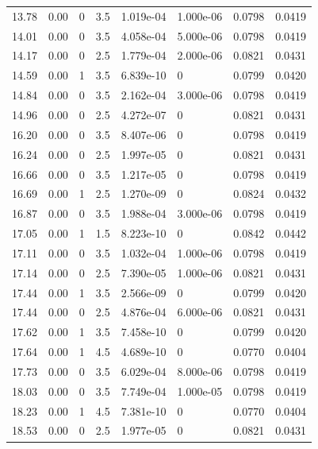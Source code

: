 \documentclass[preview]{standalone}
\begin{document}
{{{\begin{tabular}{L{1.2cm}C{1.2cm} C{0.3cm}C{0.5cm} C{1.4cm}C{1.4cm} C{1.4cm}C{1.4cm}}
  13.78  &  0.00  & 0     & 3.5 &  1.019e-04  & 1.000e-06  & 0.0798 &  0.0419   \\ 
  14.01  &  0.00  & 0     & 3.5 &  4.058e-04  & 5.000e-06  & 0.0798 &  0.0419   \\ 
  14.17  &  0.00  & 0     & 2.5 &  1.779e-04  & 2.000e-06  & 0.0821 &  0.0431   \\ 
  14.59  &  0.00  & 1     & 3.5 &  6.839e-10  & 0  & 0.0799 &  0.0420   \\ 
  14.84  &  0.00  & 0     & 3.5 &  2.162e-04  & 3.000e-06  & 0.0798 &  0.0419   \\ 
  14.96  &  0.00  & 0     & 2.5 &  4.272e-07  & 0  & 0.0821 &  0.0431   \\ 
  16.20  &  0.00  & 0     & 3.5 &  8.407e-06  & 0  & 0.0798 &  0.0419   \\ 
  16.24  &  0.00  & 0     & 2.5 &  1.997e-05  & 0  & 0.0821 &  0.0431   \\ 
  16.66  &  0.00  & 0     & 3.5 &  1.217e-05  & 0  & 0.0798 &  0.0419   \\ 
  16.69  &  0.00  & 1     & 2.5 &  1.270e-09  & 0  & 0.0824 &  0.0432   \\ 
  16.87  &  0.00  & 0     & 3.5 &  1.988e-04  & 3.000e-06  & 0.0798 &  0.0419   \\ 
  17.05  &  0.00  & 1     & 1.5 &  8.223e-10  & 0  & 0.0842 &  0.0442   \\ 
  17.11  &  0.00  & 0     & 3.5 &  1.032e-04  & 1.000e-06  & 0.0798 &  0.0419   \\ 
  17.14  &  0.00  & 0     & 2.5 &  7.390e-05  & 1.000e-06  & 0.0821 &  0.0431   \\ 
  17.44  &  0.00  & 1     & 3.5 &  2.566e-09  & 0  & 0.0799 &  0.0420   \\ 
  17.44  &  0.00  & 0     & 2.5 &  4.876e-04  & 6.000e-06  & 0.0821 &  0.0431   \\ 
  17.62  &  0.00  & 1     & 3.5 &  7.458e-10  & 0  & 0.0799 &  0.0420   \\ 
  17.64  &  0.00  & 1     & 4.5 &  4.689e-10  & 0  & 0.0770 &  0.0404   \\ 
  17.73  &  0.00  & 0     & 3.5 &  6.029e-04  & 8.000e-06  & 0.0798 &  0.0419   \\ 
  18.03  &  0.00  & 0     & 3.5 &  7.749e-04  & 1.000e-05  & 0.0798 &  0.0419   \\ 
  18.23  &  0.00  & 1     & 4.5 &  7.381e-10  & 0  & 0.0770 &  0.0404   \\ 
  18.53  &  0.00  & 0     & 2.5 &  1.977e-05  & 0  & 0.0821 &  0.0431   \\ 

\end{tabular}}}}
\end{document}

